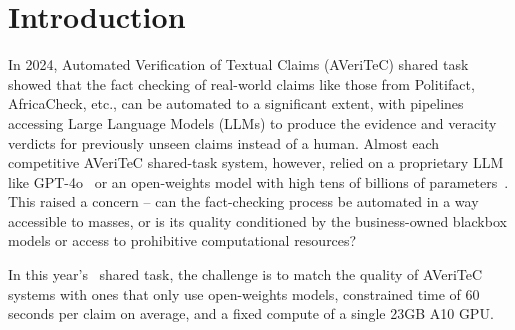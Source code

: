 


\section{Introduction}
\label{sec:introduction}
In 2024, Automated Verification of Textual Claims (AVeriTeC) shared task~\cite{schlichtkrull-etal-2024-automated} showed that the fact checking of real-world claims like those from Politifact, AfricaCheck, etc., can be automated to a significant extent, with pipelines accessing Large Language Models (LLMs) to produce the evidence and veracity verdicts for previously unseen claims instead of a human.
Almost each competitive AVeriTeC shared-task system, however, relied on a proprietary LLM like GPT-4o~\cite{rothermel-etal-2024-infact,ullrich-etal-2024-aic} or an open-weights model with high tens of billions of parameters~\cite{yoon-etal-2024-hero}.
This raised a concern -- can the fact-checking process be automated in a way accessible to masses, or is its quality conditioned by the business-owned blackbox models or access to prohibitive computational resources?

In this year's~\averitec{} shared task, the challenge is to match the quality of AVeriTeC systems with ones that only use open-weights models, constrained time of 60 seconds per claim on average, and a fixed compute of a single 23GB A10 GPU.

